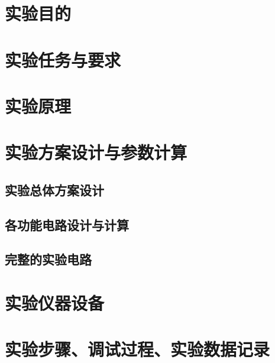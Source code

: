 \documentclass[10.5pt]{config}
\date{} %
\begin{document}
\makeheader %


\section{实验目的}

\section{实验任务与要求}

\section{实验原理}

\section{实验方案设计与参数计算}
\subsection{实验总体方案设计}
\subsection{各功能电路设计与计算}
\subsection{完整的实验电路}

\section{实验仪器设备}

\section{实验步骤、调试过程、实验数据记录}
\end{document}
